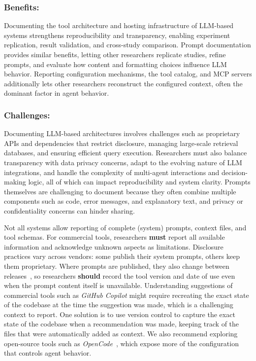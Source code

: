 \documentclass[smallextended]{svjour3}
\newcommand{\must}{\textbf{must}\xspace}
\newcommand{\should}{\textbf{should}\xspace}
\newcommand{\guidelinesubsubsection}[1]{\subsubsection{\bfseries #1:}}
\newcommand{\guidelinesubsubsection}[1]{\subsubsection{#1}}
\begin{document}
\guidelinesubsubsection{Benefits}

Documenting the tool architecture and hosting infrastructure of LLM-based systems strengthens reproducibility and transparency, enabling experiment replication, result validation, and cross-study comparison.
Prompt documentation provides similar benefits, letting other researchers replicate studies, refine prompts, and evaluate how content and formatting choices influence LLM behavior.
Reporting configuration mechanisms, the tool catalog, and MCP servers additionally lets other researchers reconstruct the configured context, often the dominant factor in agent behavior.

\guidelinesubsubsection{Challenges}

Documenting LLM-based architectures involves challenges such as proprietary APIs and dependencies that restrict disclosure, managing large-scale retrieval databases, and ensuring efficient query execution.
Researchers must also balance transparency with data privacy concerns, adapt to the evolving nature of LLM integrations, and handle the complexity of multi-agent interactions and decision-making logic, all of which can impact reproducibility and system clarity.
Prompts themselves are challenging to document because they often combine multiple components such as code, error messages, and explanatory text, and privacy or confidentiality concerns can hinder sharing.

Not all systems allow reporting of complete (system) prompts, context files, and tool schemas.
For commercial tools, researchers \must report all available information and acknowledge unknown aspects as limitations.
Disclosure practices vary across vendors: some publish their system prompts, others keep them proprietary.
Where prompts are published, they also change between releases~\cite{willison2026opus}, so researchers \should record the tool version and date of use even when the prompt content itself is unavailable.
Understanding suggestions of commercial tools such as \emph{GitHub Copilot} might require recreating the exact state of the codebase at the time the suggestion was made, which is a challenging context to report.
One solution is to use version control to capture the exact state of the codebase when a recommendation was made, keeping track of the files that were automatically added as context.
We also recommend exploring open-source tools such as \emph{OpenCode}~\cite{opencode}, which expose more of the configuration that controls agent behavior.
\end{document}
